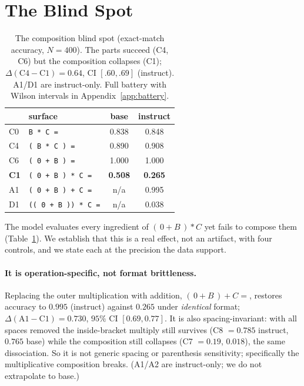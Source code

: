 \section{The Blind Spot}
\label{sec:blindspot}

\begin{table}[t]
\centering
\footnotesize
\setlength{\tabcolsep}{3.2pt}
\begin{tabular}{@{}llcc@{}}
\toprule
 & surface & base & instruct \\
\midrule
C0 & \texttt{B * C =} & 0.838 & 0.848 \\
C4 & \texttt{( B * C ) =} & 0.890 & 0.908 \\
C6 & \texttt{( 0 + B ) =} & 1.000 & 1.000 \\
\textbf{C1} & \texttt{( 0 + B ) * C =} & \textbf{0.508} & \textbf{0.265} \\
A1 & \texttt{( 0 + B ) + C =} & n/a & 0.995 \\
D1 & \texttt{(( 0 + B )) * C =} & n/a & 0.038 \\
\bottomrule
\end{tabular}
\caption{The composition blind spot (exact-match accuracy, $N{=}400$). The parts succeed
(C4, C6) but the composition collapses (C1); $\Delta(\text{C4}{-}\text{C1}) = 0.64$, CI
$[.60,.69]$ (instruct). A1/D1 are instruct-only. Full battery with Wilson intervals in
Appendix~\ref{app:battery}.}
\label{tab:battery}
\end{table}

The model evaluates every ingredient of $(\,0 + B\,) * C$ yet fails to compose them
(Table~\ref{tab:battery}). We establish that this is a real effect, not an artifact,
with four controls, and we state each at the precision the data support.

\paragraph{It is operation-specific, not format brittleness.} Replacing the outer
multiplication with addition, $(\,0 + B\,) + C =$, restores accuracy to $0.995$ (instruct)
against $0.265$ under \emph{identical} format; $\Delta(\text{A1}-\text{C1}) = 0.730$, $95\%$ CI
$[0.69, 0.77]$. It is also spacing-invariant: with all spaces removed the inside-bracket
multiply still survives (C8 $= 0.785$ instruct, $0.765$ base) while the composition still
collapses (C7 $= 0.19$, $0.018$), the same dissociation. So it is not generic spacing or
parenthesis sensitivity; specifically the multiplicative composition breaks. (A1/A2 are
instruct-only; we do not extrapolate to base.)

